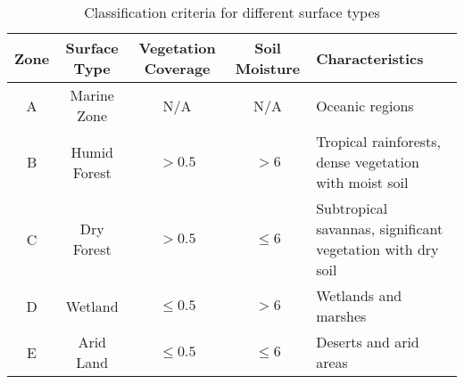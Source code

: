 \documentclass[fleqn,10pt]{wlscirep_mdpi_style}
\begin{document}
\begin{table}[!htbp]
\centering
\caption{\label{tab:table2}Classification criteria for different surface types}
\begin{tabularx}{\textwidth}{@{} c c c c X @{}} 
\toprule
\textbf{Zone} & \textbf{Surface Type} & \textbf{Vegetation Coverage} & \textbf{Soil Moisture} & \textbf{Characteristics} \\
\midrule
A & Marine Zone & N/A       & N/A       & Oceanic regions \\
B & Humid Forest& $>0.5$    & $>6$      & Tropical rainforests, dense vegetation with moist soil \\
C & Dry Forest  & $>0.5$    & $\le 6$   & Subtropical savannas, significant vegetation with dry soil \\
D & Wetland     & $\le 0.5$ & $>6$      & Wetlands and marshes \\
E & Arid Land   & $\le 0.5$ & $\le 6$   & Deserts and arid areas \\
\bottomrule
\end{tabularx}
\end{table}
\end{document}
